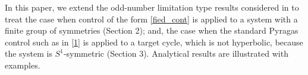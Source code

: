 \documentclass{article}
\begin{document}
In this paper, we extend the odd-number limitation type results considered in \cite{hooton_amann} to treat the case when control of the form \eqref{fied_cont}
is applied to a system with a finite group of symmetries (Section 2);
and, the case when the standard Pyragas control such as in \eqref{1}
is applied to a target cycle, which is not hyperbolic, because the system is $S^1$-symmetric (Section 3).
Analytical results are illustrated with examples.



\end{document}
